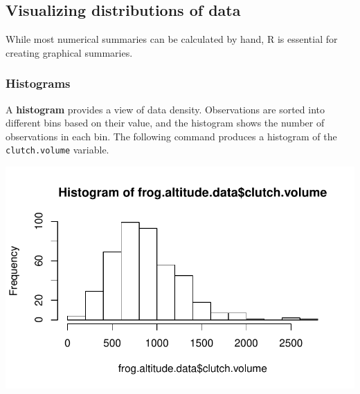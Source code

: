 \subsection{Visualizing distributions of data}
While most numerical summaries can be calculated by hand, \textsf{R} is essential for creating graphical summaries.

\subsubsection{Histograms}
A \textbf{histogram} provides a view of data density. Observations are sorted into different bins based on their value, and the histogram shows the number of observations in each bin. The following command produces a histogram of the \texttt{clutch.volume} variable.

\begin{knitrout}
\color{fgcolor}\begin{kframe}
\begin{alltt}
\hlopt{$}
\end{alltt}
\end{kframe}
\includegraphics[width=\maxwidth]{figure/unnamed-chunk-19-1} 

\end{knitrout}

